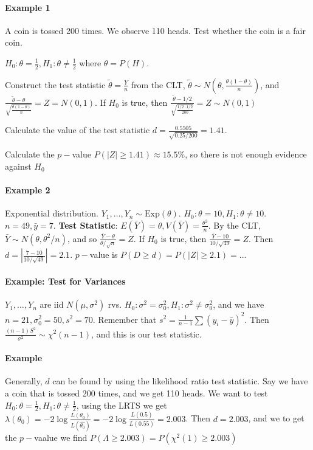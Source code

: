 \documentclass[10pt,letter]{article}
\theoremstyle{plain}
\theoremstyle{definition}
\begin{document}
\paragraph{Example 1}
A coin is tossed 200 times. We observe 110 heads. Test whether the coin is a fair coin. 
\begin{steps}
     \item $H_0:\theta=\frac{1}{2},H_1:\theta\neq\frac{1}{2}$ where $\theta=P(H)$.  
     \item Construct the test statistic $\tilde\theta=\frac{Y}{n}$ from the CLT, $\tilde\theta\sim N\left(\theta,\frac{\theta(1-\theta)}{n}\right)$, and $\frac{\tilde\theta-\theta}{\sqrt{\frac{\theta(1-\theta)}{n}}}=Z=N(0,1)$. If $H_0$ is true, then $\frac{\tilde\theta-1/2}{\sqrt{\frac{1/2\cdot1/2}{200}}}=Z\sim N(0,1)$
     \item Calculate the value of the test statistic $d=\frac{0.5505}{\sqrt{0.25/200}}=1.41$. 
     \item Calculate the $p-$value $P(|Z|\geq1.41)\approx15.5\%$, so there is not enough evidence against $H_0$
\end{steps}

\paragraph{Example 2}
Exponential distribution. $Y_1,\ldots,Y_n\sim\text{Exp}(\theta)$. $H_0:\theta=10,H_1:\theta\neq10$. $n=49,\bar{y}=7$. \textbf{Test Statistic}: $E(\bar{Y})=\theta,V(\bar{Y})=\frac{\theta^2}{n}$. By the CLT, $\bar{Y}\sim N(\theta,\theta^2/n)$, and so $\frac{\bar{Y}-\theta}{\theta/\sqrt{n}}=Z$. If $H_0$ is true, then $\frac{\bar{Y}-10}{10/\sqrt{49}}=Z$. Then $d=|\frac{7-10}{10/\sqrt{49}}|=2.1$. $p-$value is $P(D\geq d)=P(|Z|\geq2.1)=...$ 

\paragraph{Example: Test for Variances}
$Y_1,\ldots,Y_n$ are iid $N(\mu,\sigma^2)$ rvs. $H_0:\sigma^2=\sigma_0^2,H_1:\sigma^2\neq\sigma_0^2$, and we have $n=21,\sigma_0^2=50, s^2=70$. Remember that $s^2=\frac{1}{n-1}\sum(y_i-\bar{y})^2$. Then $\frac{(n-1)S^2}{\sigma^2}\sim\chi^2(n-1)$, and this is our test statistic. 

\paragraph{Example}
Generally, $d$ can be found by using the likelihood ratio test statistic. Say we have a coin that is tossed 200 times, and we get 110 heads. We want to test $H_0:\theta=\frac{1}{2},H_1:\theta\neq\frac{1}{2}$, using the LRTS we get $\lambda(\theta_0)=-2\log\frac{L(\theta_0)}{L(\hat{\theta_0})}=-2\log\frac{L(0.5)}{L(0.55)}=2.003$. Then $d=2.003$, and we to get the $p-$vaalue we find $P(\Lambda\geq2.003)=P(\chi^2(1)\geq2.003)$ 
\end{document}
